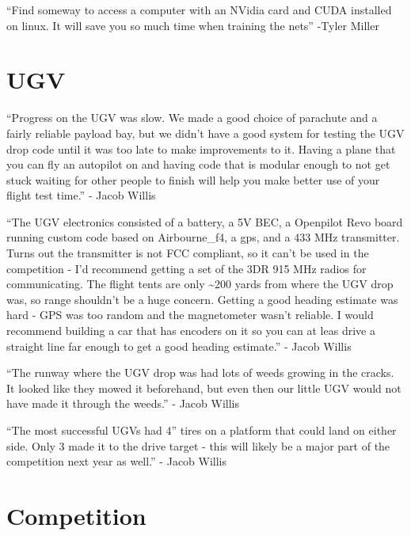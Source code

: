 {}

{``Find someway to access a computer with an NVidia card and CUDA
installed on linux. It will save you so much time when training the
nets'' -Tyler Miller}

\hypertarget{h.jeaggz3ydved}{\section{\texorpdfstring{{UGV}}{UGV}}\label{h.jeaggz3ydved}}

{``Progress on the UGV was slow. We made a good choice of parachute and
a fairly reliable payload bay, but we didn't have a good system for
testing the UGV drop code until it was too late to make improvements to
it. Having a plane that you can fly an autopilot on and having code that
is modular enough to not get stuck waiting for other people to finish
will help you make better use of your flight test time.'' - Jacob
Willis}

{}

{``The UGV electronics consisted of a battery, a 5V BEC, a Openpilot
Revo board running custom code based on Airbourne\_f4, a gps, and a 433
MHz transmitter. Turns out the transmitter is not FCC compliant, so it
can't be used in the competition - I'd recommend getting a set of the
3DR 915 MHz radios for communicating. The flight tents are only
\textasciitilde{}200 yards from where the UGV drop was, so range
shouldn't be a huge concern. Getting a good heading estimate was hard -
GPS was too random and the magnetometer wasn't reliable. I would
recommend building a car that has encoders on it so you can at leas
drive a straight line far enough to get a good heading estimate.'' -
Jacob Willis}

{}

{``The runway where the UGV drop was had lots of weeds growing in the
cracks. It looked like they mowed it beforehand, but even then our
little UGV would not have made it through the weeds.'' - Jacob Willis}

{}

{``The most successful UGVs had 4'' tires on a platform that could land
on either side. Only 3 made it to the drive target - this will likely be
a major part of the competition next year as well.'' - Jacob Willis}

\hypertarget{h.igopbhq1riqa}{\section{\texorpdfstring{{Competition}}{Competition}}\label{h.igopbhq1riqa}}

